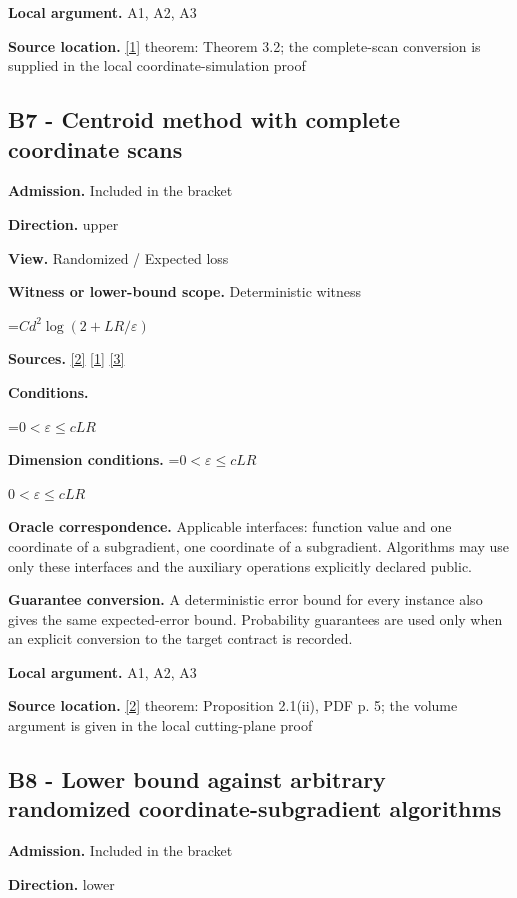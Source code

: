 \documentclass[10pt,a4paper]{article}
\newcommand{\AtlasMath}[1]{\par\begingroup\centering\setbox0=\hbox{$\displaystyle #1$}\ifdim\wd0>1.4\linewidth\typeout{ATLAS WIDE FORMULA: \the\wd0}\fi\ifdim\wd0>\linewidth\resizebox{\linewidth}{!}{\box0}\else\box0\fi\par\endgroup}
\newcommand{\AtlasInlineMath}[1]{\begingroup\setbox0=\hbox{$#1$}\ifdim\wd0>.4\linewidth\endgroup\AtlasMath{#1}\else\endgroup$#1$\fi}
\begin{document}
\textbf{Local argument.} A1, A2, A3

\textbf{Source location.} \href{https://arxiv.org/pdf/1405.4980}{[1]} theorem: Theorem 3.2; the complete-scan conversion is supplied in the local coordinate-simulation proof

\subsection{B7 - Centroid method with complete coordinate scans}
\textbf{Admission.} Included in the bracket

\textbf{Direction.} upper

\textbf{View.} Randomized / Expected loss

\textbf{Witness or lower-bound scope.} Deterministic witness

\AtlasMath{Cd^2\log(2+LR/\varepsilon)}
\textbf{Sources.} \href{https://www2.isye.gatech.edu/~nemirovs/MOR_AccuracyCertificates.pdf}{[2]} \href{https://arxiv.org/pdf/1405.4980}{[1]} \href{https://arxiv.org/pdf/2609.20701}{[3]}

\textbf{Conditions.} 
\AtlasMath{0<\varepsilon\le cLR}


\textbf{Dimension conditions.} \AtlasInlineMath{0<\varepsilon\le cLR}

\textbf{Oracle correspondence.} Applicable interfaces: function value and one coordinate of a subgradient, one coordinate of a subgradient. Algorithms may use only these interfaces and the auxiliary operations explicitly declared public.

\textbf{Guarantee conversion.} A deterministic error bound for every instance also gives the same expected-error bound. Probability guarantees are used only when an explicit conversion to the target contract is recorded.

\textbf{Local argument.} A1, A2, A3

\textbf{Source location.} \href{https://www2.isye.gatech.edu/~nemirovs/MOR_AccuracyCertificates.pdf}{[2]} theorem: Proposition 2.1(ii), PDF p. 5; the volume argument is given in the local cutting-plane proof

\subsection{B8 - Lower bound against arbitrary randomized coordinate-subgradient algorithms}
\textbf{Admission.} Included in the bracket

\textbf{Direction.} lower
\end{document}

